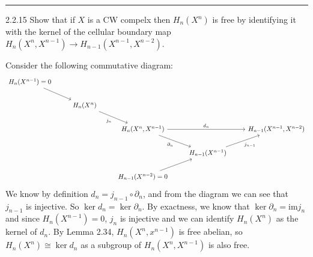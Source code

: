 \documentclass[a4paper, 12pt]{article}
\begin{document}
\noindent\rule{7in}{2.8pt}
\begin{problem}{2.2.15}
Show that if \(X\) is a CW compelx then \(H_n(X^n)\) is free by identifying it with the kernel of the cellular boundary map \(H_n(X^n,X^{n-1})\rightarrow H_{n-1}(X^{n-1},X^{n-2})\).	
\end{problem}
\begin{solution}
Consider the following commutative diagram:
\[\begin{tikzcd}
	{H_n(X^{n-1})=0} \\
	& {H_n(X^n)} \\
	&& {H_n(X^n,X^{n-1})} && {H_{n-1}(X^{n-1},X^{n-2})} \\
	&&& {H_{n-1}(X^{n-1})} \\
	&& {H_{n-1}(X^{n-2})=0}
	\arrow[from=1-1, to=2-2]
	\arrow["{j_n}"', from=2-2, to=3-3]
	\arrow["{d_n}", from=3-3, to=3-5]
	\arrow["{\partial_n}"', from=3-3, to=4-4]
	\arrow["{j_{n-1}}"', from=4-4, to=3-5]
	\arrow[from=5-3, to=4-4]
\end{tikzcd}\]
We know by definition \(d_n=j_{n-1}\circ \partial_n\), and from the diagram we can see that \(j_{n-1}\) is injective. So \(\ker d_n=\ker \partial_n\). By exactness, we know that 
\(\ker \partial_n=\text{im} j_n\) and since \(H_n(X^{n-1})=0\), \(j_n\) is injective and we can identify \(H_n(X^n)\) as the kernel of \(d_n\). By Lemma 2.34, \(H_n(X^n,x^{n-1})\) is free abelian, so 
\(H_n(X^n)\cong \ker d_n\) as a subgroup of \(H_n(X^n,X^{n-1})\) is also free.
\end{solution}
\end{document}
